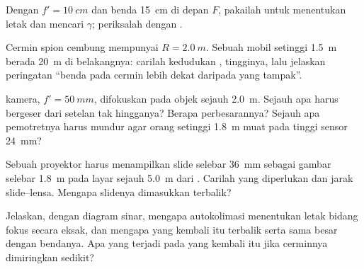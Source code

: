 \begin{exercise}[$\star$]\label{exo:b1:mirrors-thin-lenses:4}
Dengan $f' = \qty{10}{cm}$ dan benda \qty{15}{cm} di depan $F$,
pakailah  untuk menentukan letak  dan mencari
$\gamma$; periksalah dengan .
\end{exercise}

\begin{exercise}[$\star\star$]\label{exo:b1:mirrors-thin-lenses:5}
Cermin spion cembung mempunyai $R = \qty{2.0}{m}$. Sebuah mobil setinggi
\qty{1.5}{m} berada \qty{20}{m} di belakangnya: carilah kedudukan
, tingginya, lalu jelaskan peringatan ``benda pada cermin
lebih dekat daripada yang tampak''.
\end{exercise}

\begin{exercise}[$\star\star$]\label{exo:b1:mirrors-thin-lenses:6}
 kamera, $f' = \qty{50}{mm}$, difokuskan pada objek sejauh
\qty{2.0}{m}. Sejauh apa  harus bergeser dari setelan tak
hingganya? Berapa perbesarannya? Sejauh apa pemotretnya harus mundur
agar orang setinggi \qty{1.8}{m} muat pada tinggi sensor \qty{24}{mm}?
\end{exercise}

\begin{exercise}[$\star\star$]\label{exo:b1:mirrors-thin-lenses:7}
Sebuah proyektor harus menampilkan slide selebar \qty{36}{mm} sebagai
gambar selebar \qty{1.8}{m} pada layar sejauh \qty{5.0}{m} dari
. Carilah  yang diperlukan dan jarak slide--lensa.
Mengapa slidenya dimasukkan terbalik?
\end{exercise}

\begin{exercise}[$\star\star$]\label{exo:b1:mirrors-thin-lenses:8}
Jelaskan, dengan diagram sinar, mengapa autokolimasi menentukan letak
bidang fokus secara eksak, dan mengapa  yang kembali itu
terbalik serta sama besar dengan bendanya. Apa yang terjadi pada
 yang kembali itu jika cerminnya dimiringkan sedikit?
\end{exercise}

